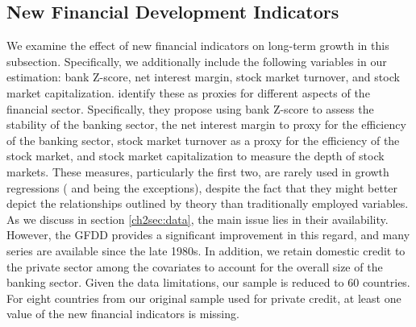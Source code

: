 \begin{refsection}
\subsection{New Financial Development Indicators}
We examine the effect of new financial indicators on long-term growth in this subsection. Specifically, we additionally include the following variables in our estimation: bank Z-score, net interest margin, stock market turnover, and stock market capitalization. \textcite{Cihaketal2013} identify these as proxies for different aspects of the financial sector. Specifically, they propose using bank Z-score to assess the stability of the banking sector, the net interest margin to proxy for the efficiency of the banking sector, stock market turnover as a proxy for the efficiency of the stock market, and stock market capitalization to measure the depth of stock markets. These measures, particularly the first two, are rarely used in growth regressions (\textcite{Bergeretal2004} and \textcite{Hasanetal2009} being the exceptions), despite the fact that they might better depict the relationships outlined by theory than traditionally employed variables. As we discuss in section \ref{ch2sec:data}, the main issue lies in their availability. However, the \ac{GFDD} provides a significant improvement in this regard, and many series are available since the late 1980s. In addition, we retain domestic credit to the private sector among the covariates to account for the overall size of the banking sector. Given the data limitations, our sample is reduced to 60 countries. For eight countries from our original sample used for private credit, at least one value of the new financial indicators is missing.


\end{refsection}
